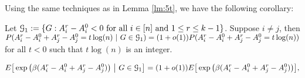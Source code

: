 \documentclass{article}
\begin{document}
Using the same techniques as in Lemma \ref{lm:5t}, we have the following corollary:
\begin{corollary}\label{lem:ucBA}
Let $\mathcal{G}_1:=\{G:A^r_i-A^0_i<0\text{~for all~}i\in[n] \text{ and } 1\leq r \leq k-1\}$. Suppose $i\neq j$, then $P(A^r_i-A^0_i + A^r_j - A^0_j= t\log(n)~|~G\in\mathcal{G}_1)= (1+o(1))P(A^r_i-A^0_i + A^r_j - A^0_j= t\log(n))$ for all $t<0$ such that $t\log(n)$ is an integer.
\end{corollary}
\begin{lemma}\label{lem:BijG}
\begin{equation} 
E \big[  \exp\big(\beta (A^r_i-A^0_i + A^r_j - A^0_j) \big) ~\big|~ G\in\mathcal{G}_1 \big] 
= (1+o(1)) E \big[  \exp\big(\beta (A^r_i-A^0_i + A^r_j - A^0_j) \big) \big] ,
\end{equation}
\end{lemma}
\end{document}

